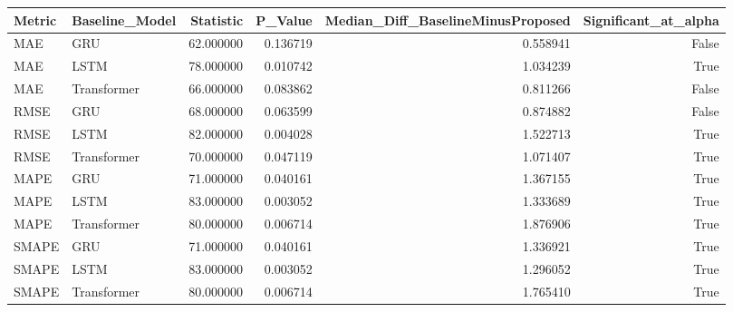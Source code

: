 \begin{tabular}{llrrrr}
\toprule
Metric & Baseline_Model & Statistic & P_Value & Median_Diff_BaselineMinusProposed & Significant_at_alpha \\
\midrule
MAE & GRU & 62.000000 & 0.136719 & 0.558941 & False \\
MAE & LSTM & 78.000000 & 0.010742 & 1.034239 & True \\
MAE & Transformer & 66.000000 & 0.083862 & 0.811266 & False \\
RMSE & GRU & 68.000000 & 0.063599 & 0.874882 & False \\
RMSE & LSTM & 82.000000 & 0.004028 & 1.522713 & True \\
RMSE & Transformer & 70.000000 & 0.047119 & 1.071407 & True \\
MAPE & GRU & 71.000000 & 0.040161 & 1.367155 & True \\
MAPE & LSTM & 83.000000 & 0.003052 & 1.333689 & True \\
MAPE & Transformer & 80.000000 & 0.006714 & 1.876906 & True \\
SMAPE & GRU & 71.000000 & 0.040161 & 1.336921 & True \\
SMAPE & LSTM & 83.000000 & 0.003052 & 1.296052 & True \\
SMAPE & Transformer & 80.000000 & 0.006714 & 1.765410 & True \\
\bottomrule
\end{tabular}
